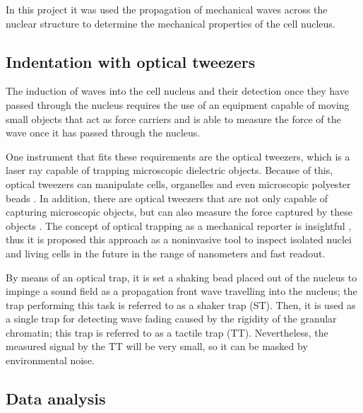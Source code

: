 \documentclass[12pt, a4paper]{article} %
\begin{document}
	In this project it was used the propagation of mechanical waves across the nuclear structure to determine the mechanical properties of the cell nucleus.
	
	\setlength{\parskip}{0mm}
	
	\subsection{Indentation with optical tweezers}
	
	The induction of waves into the cell nucleus and their detection once they have passed through the nucleus requires the use of an equipment capable of moving small objects that act as force carriers and is able to measure the force of the wave once it has passed through the nucleus. 
	
	\setlength{\parskip}{4mm}
	
	One instrument that fits these requirements are the optical tweezers, which is a laser ray capable of trapping microscopic dielectric objects. Because of this, optical tweezers can manipulate cells, organelles and even microscopic polyester beads \cite{novotny1997theory, ombid2020vitro, ashkin1992forces}. In addition, there are optical tweezers that are not only capable of capturing microscopic objects, but can also measure the force captured by these objects \cite{farre2014force}. The concept of optical trapping as a mechanical reporter is insightful \cite{ashkin20182018}, thus it is proposed this approach as a noninvasive tool to inspect isolated nuclei and living cells in the future in the range of nanometers and fast readout.
	
	By means of an optical trap, it is set a shaking bead placed out of the nucleus to impinge a sound field as a propagation front wave travelling into the nucleus; the trap performing this task is referred to as a shaker trap (ST). Then, it is used as a single trap for detecting wave fading caused by the rigidity of the granular chromatin; this trap is referred to as a tactile trap (TT). Nevertheless, the measured signal by the TT will be very small, so it can be masked by environmental noise. 
	
	\setlength{\parskip}{0mm}
	
	\subsection{Data analysis}
	
\end{document}
